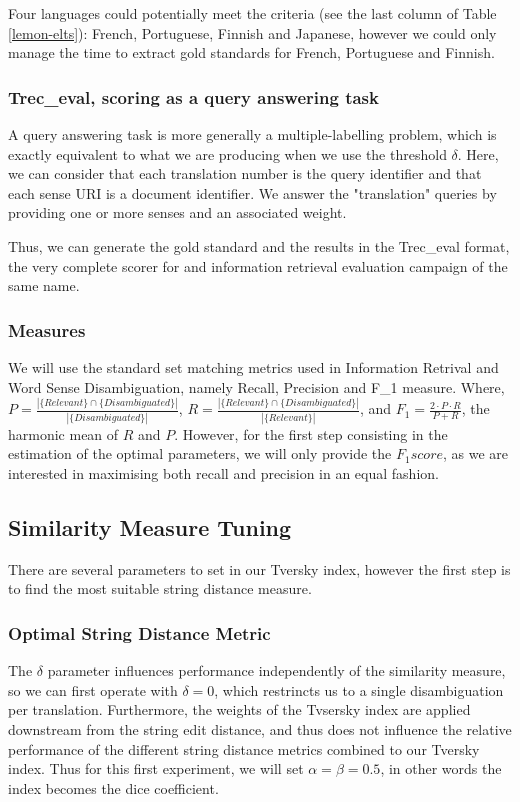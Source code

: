 \documentclass[10pt, a4paper]{article}
\begin{document}
Four languages could potentially meet the criteria (see the last column of Table \ref{lemon-elts}): French, Portuguese, Finnish and Japanese, however we could only manage the time to extract gold standards for French, Portuguese and Finnish.

\subsubsection{Trec\_eval, scoring as a query answering task}

A query answering task is more generally a multiple-labelling problem, which is exactly equivalent to what we are producing when we use the threshold \(\delta\). Here, we can consider that each translation number is the query identifier and that each sense URI is a document identifier. We answer the "translation" queries by providing one or more senses and an associated weight.

Thus, we can generate the gold standard and the results in the Trec\_eval format, the very complete scorer for and information retrieval evaluation campaign of the same name.

\subsubsection{Measures}
We will use the standard set matching metrics used in Information Retrival and Word Sense Disambiguation, namely Recall, Precision and F\_{1} measure. Where, \(P=\frac{|\{Relevant\}\cap\{Disambiguated\}|}{|\{Disambiguated\}|}\), \(R=\frac{|\{Relevant\}\cap\{Disambiguated\}|}{|\{Relevant\}|}\), and \(F_1 = \frac{2\cdot P \cdot R}{P + R} \), the harmonic mean of \(R\) and \(P\). However, for the first step consisting in the estimation of the optimal parameters, we will only provide the \(F_1 score\), as we are interested in maximising both recall and precision in an equal fashion.
\subsection{Similarity Measure Tuning}
There are several parameters to set in our Tversky index, however the first step is to find the most suitable string distance measure.

\subsubsection{Optimal String Distance Metric}
 The \(\delta\) parameter influences performance independently of the similarity measure, so we can first operate with \(\delta=0\), which restrincts us to a single disambiguation per translation. Furthermore, the weights of the Tvsersky index are applied downstream from the string edit distance, and thus does not influence the relative performance of the different string distance metrics combined to our  Tversky index. Thus for this first experiment, we will set \(\alpha=\beta=0.5\), in other words the index becomes the dice coefficient.
\end{document}
